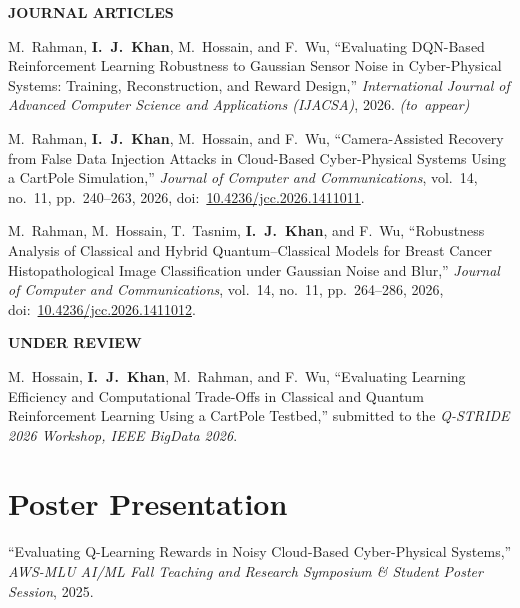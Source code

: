 \documentclass[10pt,letterpaper]{article}
\newcommand{\toappear}{ {\color{muted}\mbox{\textit{(to appear)}}}}
\begin{document}
\vspace{2pt}\textbf{\color{muted}\footnotesize JOURNAL ARTICLES}
\begin{enumerate}[leftmargin=2.1em,itemsep=1.5pt,topsep=2pt,label={[J\arabic*]}]
  \item M.~Rahman, \textbf{I.~J.~Khan}, M.~Hossain, and F.~Wu, ``Evaluating DQN-Based Reinforcement Learning
  Robustness to Gaussian Sensor Noise in Cyber-Physical Systems: Training, Reconstruction, and Reward Design,''
  \textit{International Journal of Advanced Computer Science and Applications (IJACSA)}, 2026.\toappear
  \item M.~Rahman, \textbf{I.~J.~Khan}, M.~Hossain, and F.~Wu, ``Camera-Assisted Recovery from False Data Injection
  Attacks in Cloud-Based Cyber-Physical Systems Using a CartPole Simulation,'' \textit{Journal of Computer and
  Communications}, vol.~14, no.~11, pp.~240--263, 2026, doi:~\href{https://doi.org/10.4236/jcc.2026.1411011}{10.4236/jcc.2026.1411011}.
  \item M.~Rahman, M.~Hossain, T.~Tasnim, \textbf{I.~J.~Khan}, and F.~Wu, ``Robustness Analysis of Classical and
  Hybrid Quantum--Classical Models for Breast Cancer Histopathological Image Classification under Gaussian Noise
  and Blur,'' \textit{Journal of Computer and Communications}, vol.~14, no.~11, pp.~264--286, 2026, doi:~\href{https://doi.org/10.4236/jcc.2026.1411012}{10.4236/jcc.2026.1411012}.
\end{enumerate}

\vspace{2pt}\textbf{\color{muted}\footnotesize UNDER REVIEW}
\begin{enumerate}[leftmargin=2.1em,itemsep=1.5pt,topsep=2pt,label={[U\arabic*]}]
  \item M.~Hossain, \textbf{I.~J.~Khan}, M.~Rahman, and F.~Wu, ``Evaluating Learning Efficiency and
  Computational Trade-Offs in Classical and Quantum Reinforcement Learning Using a CartPole Testbed,'' submitted
  to the \textit{Q-STRIDE 2026 Workshop, IEEE BigData 2026}.
\end{enumerate}

\section{Poster Presentation}
``Evaluating Q-Learning Rewards in Noisy Cloud-Based Cyber-Physical Systems,'' \textit{AWS-MLU AI/ML Fall Teaching
and Research Symposium \& Student Poster Session}, 2025.
\end{document}
